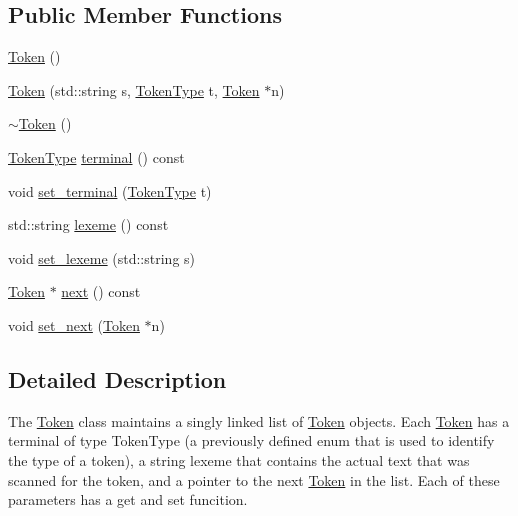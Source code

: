 \subsection*{Public Member Functions}
\begin{DoxyCompactItemize}
\item 
\hyperlink{classfcal_1_1scanner_1_1Token_a7c1dcd4c5a9c6ea04470ab2da0b7e4d3}{Token} ()
\item 
\hyperlink{classfcal_1_1scanner_1_1Token_a54db0de9cd0bcd926b050bbd8d0d17c2}{Token} (std\+::string s, \hyperlink{namespacefcal_1_1scanner_ad95bd8241e3350b2d765f6b929eb0d93}{Token\+Type} t, \hyperlink{classfcal_1_1scanner_1_1Token}{Token} $\ast$n)
\item 
\hyperlink{classfcal_1_1scanner_1_1Token_a6979a10e31af36531d793584215ea86f}{$\sim$\+Token} ()
\item 
\hyperlink{namespacefcal_1_1scanner_ad95bd8241e3350b2d765f6b929eb0d93}{Token\+Type} \hyperlink{classfcal_1_1scanner_1_1Token_a7b747b360066596ea0eff67cf6e66c2a}{terminal} () const 
\item 
void \hyperlink{classfcal_1_1scanner_1_1Token_ae3973c2cfd30cb69f4f02d73f61340ba}{set\+\_\+terminal} (\hyperlink{namespacefcal_1_1scanner_ad95bd8241e3350b2d765f6b929eb0d93}{Token\+Type} t)
\item 
std\+::string \hyperlink{classfcal_1_1scanner_1_1Token_a57ea69c68799d3e4ef944e3a8b94f4fc}{lexeme} () const 
\item 
void \hyperlink{classfcal_1_1scanner_1_1Token_af74f683b280f051908c85c23b9dcb7ad}{set\+\_\+lexeme} (std\+::string s)
\item 
\hyperlink{classfcal_1_1scanner_1_1Token}{Token} $\ast$ \hyperlink{classfcal_1_1scanner_1_1Token_a85eb2a513480b962b8f1a534e552e9eb}{next} () const 
\item 
void \hyperlink{classfcal_1_1scanner_1_1Token_acb2377dc944eb076830d4a660a7047c2}{set\+\_\+next} (\hyperlink{classfcal_1_1scanner_1_1Token}{Token} $\ast$n)
\end{DoxyCompactItemize}


\subsection{Detailed Description}
The \hyperlink{classfcal_1_1scanner_1_1Token}{Token} class maintains a singly linked list of \hyperlink{classfcal_1_1scanner_1_1Token}{Token} objects. Each \hyperlink{classfcal_1_1scanner_1_1Token}{Token} has a terminal of type Token\+Type (a previously defined enum that is used to identify the type of a token), a string lexeme that contains the actual text that was scanned for the token, and a pointer to the next \hyperlink{classfcal_1_1scanner_1_1Token}{Token} in the list. Each of these parameters has a get and set funcition. 

